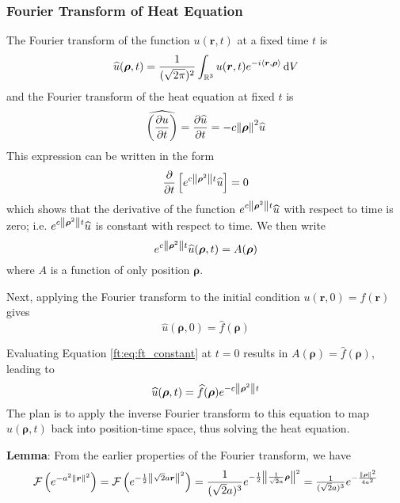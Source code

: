 \documentclass[11pt, a4paper]{article}
\newcommand{\diff}{\mathop{}\!\mathrm{d}} %
\newcommand{\R}{\mathbb{R}} %
\begin{document}
\subsubsection{Fourier Transform of Heat Equation}
The Fourier transform of the function $ u(\bm{r}, t) $ at a fixed time $ t $ is
\begin{equation*}
	\widehat{u}(\bm{\rho}, t) = \frac{1}{(\sqrt{2\pi})^2} \int_{\R^3} u(\bm{r}, t)e^{-i\expval{\bm{r}, \bm{\rho}}} \diff V
\end{equation*}
and the Fourier transform of the heat equation at fixed $ t $ is
\begin{equation*}
	\widehat{\left(\pdv{u}{t}\right)} = \pdv{\widehat{u}}{t} = - c \norm{\bm{\rho}}^2 \widehat{u}
\end{equation*}
This expression can be written in the form
\begin{equation*}
	\pdv{}{t} \left[e^{c\norm{\bm{\rho}^2}t } \widehat{u}\right] = 0
\end{equation*}
which shows that the derivative of the function $ e^{c\norm{\bm{\rho}^2}t } \widehat{u} $ with respect to time is zero; i.e. $ e^{c\norm{\bm{\rho}^2}t } \widehat{u} $ is constant with respect to time. We then write
\begin{equation}
	e^{c\norm{\bm{\rho}^2}t } \widehat{u}(\bm{\rho}, t) = A(\bm{\rho}) \label{ft:eq:ft_constant}
\end{equation}
where $ A $ is a function of only position $ \bm{\rho} $.

Next, applying the Fourier transform to the initial condition $ u(\bm{r}, 0) = f(\bm{r})$ gives
\begin{equation*}
	\widehat{u}(\bm{\rho}, 0) = \widehat{f}(\bm{\rho})
\end{equation*}

Evaluating Equation \ref{ft:eq:ft_constant} at $ t = 0 $ results in $ A(\bm{\rho}) = \widehat{f}(\bm{\rho}) $, leading to
\begin{equation*}
	\widehat{u}(\bm{\rho}, t) = \widehat{f}(\bm{\rho})   e^{-c\norm{\bm{\rho}^2}t }
\end{equation*}
The plan is to apply the inverse Fourier transform to this equation to map $ \widehat{u}(\bm{\rho}, t) $ back into position-time space, thus solving the heat equation.

\textbf{Lemma}: From the earlier properties of the Fourier transform, we have
\begin{equation*}
	\mathcal{F}\left(e^{-a^2 \norm{\bm{r}}^2} \right) = \mathcal{F}\left(e^{-\frac{1}{2}\norm{\sqrt{2}a\bm{r}}^2} \right) = \frac{1}{(\sqrt{2}a)^3}e^{-\frac{1}{2} \norm{\frac{1}{\sqrt{2}a}\bm{\rho}}^2} =  \tfrac{1}{(\sqrt{2}a)^3}e^{-\frac{\norm{\bm{\rho}}^2}{4a^2}}
\end{equation*}
\end{document}
